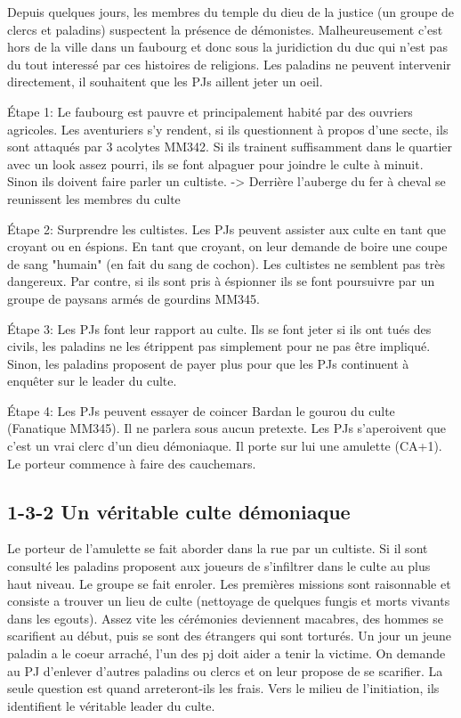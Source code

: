 Depuis quelques jours, les membres du temple du dieu de la justice (un groupe de clercs et paladins) 
suspectent la présence de démonistes. Malheureusement c'est hors de la ville dans un faubourg 
et donc sous la juridiction du duc qui n'est pas du tout interessé par ces histoires de religions.
Les paladins ne peuvent intervenir directement, il souhaitent que les PJs aillent jeter un oeil.

Étape 1: Le faubourg est pauvre et principalement habité par des ouvriers agricoles. Les aventuriers
s'y rendent, si ils questionnent à propos d'une secte, ils sont attaqués par 3 acolytes MM342. Si ils
trainent suffisamment dans le quartier avec un look assez pourri, ils se font alpaguer pour joindre le 
culte à minuit. Sinon ils doivent faire parler un cultiste.
-> Derrière l'auberge du fer à cheval se reunissent les membres du culte

Étape 2: Surprendre les cultistes. Les PJs peuvent assister aux culte en tant que croyant ou en éspions.
En tant que croyant, on leur demande de boire une coupe de sang "humain" (en fait du sang de cochon).
Les cultistes ne semblent pas très dangereux. Par contre, si ils sont pris à éspionner ils se font 
poursuivre par un groupe de paysans armés de gourdins MM345.

Étape 3: Les PJs font leur rapport au culte. Ils se font jeter si ils ont tués des civils, les paladins ne 
les étrippent pas simplement pour ne pas être impliqué. Sinon, les paladins proposent de payer plus pour 
que les PJs continuent à enquêter sur le leader du culte.

Étape 4: Les PJs peuvent essayer de coincer Bardan le gourou du culte (Fanatique MM345). Il ne parlera
sous aucun pretexte. Les PJs s'aperoivent que c'est un vrai clerc d'un dieu démoniaque. Il porte sur lui 
une amulette (CA+1). Le porteur commence à faire des cauchemars.

\subsection*{1-3-2 Un véritable culte démoniaque}

Le porteur de l'amulette se fait aborder dans la rue par un cultiste. Si il sont consulté les paladins
proposent aux joueurs de s'infiltrer dans le culte au plus haut niveau. Le groupe se fait enroler. 
Les premières missions sont raisonnable et consiste a trouver un lieu de culte (nettoyage de quelques
fungis et morts vivants dans les egouts). Assez vite les cérémonies deviennent macabres, des hommes se 
scarifient au début, puis se sont des étrangers qui sont torturés. Un jour un jeune paladin a le coeur 
arraché, l'un des pj doit aider a tenir la victime. On demande au PJ d'enlever d'autres paladins ou
clercs et on leur propose de se scarifier. La seule question est quand arreteront-ils les frais. Vers le 
milieu de l'initiation, ils identifient le véritable leader du culte.

